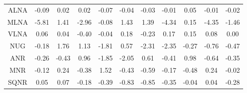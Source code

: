 \documentclass[11pt,a4paper]{report}
\begin{document}
\begin{longtable}{ | c || c | c | c | c | c | c | c | c | c || c |}
ALNA &  \cellcolor[HTML]{FFFFFF} -0.09 &  \cellcolor[HTML]{FFFFFF} 0.02 &  \cellcolor[HTML]{FFFFFF} 0.02 &  \cellcolor[HTML]{FFFFFF} -0.07 &  \cellcolor[HTML]{FFFFFF} -0.04 &  \cellcolor[HTML]{FFFFFF} -0.03 &  \cellcolor[HTML]{FFFFFF} -0.01 &  \cellcolor[HTML]{FFFFFF} 0.05 &  \cellcolor[HTML]{FFFFFF} -0.01 &  \cellcolor[HTML]{FFFFFF} -0.02 \\
MLNA &  \cellcolor[HTML]{FF7070} -5.81 &  \cellcolor[HTML]{DFDFFF} 1.41 &  \cellcolor[HTML]{FFB7B7} -2.96 &  \cellcolor[HTML]{FFFFFF} -0.08 &  \cellcolor[HTML]{DFDFFF} 1.43 &  \cellcolor[HTML]{DFDFFF} 1.39 &  \cellcolor[HTML]{FF8F8F} -4.34 &  \cellcolor[HTML]{FFFFFF} 0.15 &  \cellcolor[HTML]{FF8F8F} -4.35 &  \cellcolor[HTML]{FFD7D7} -1.46 \\
VLNA &  \cellcolor[HTML]{FFFFFF} 0.06 &  \cellcolor[HTML]{FFFFFF} 0.04 &  \cellcolor[HTML]{FFF7F7} -0.40 &  \cellcolor[HTML]{FFFFFF} -0.04 &  \cellcolor[HTML]{F7F7FF} 0.18 &  \cellcolor[HTML]{FFF7F7} -0.23 &  \cellcolor[HTML]{F7F7FF} 0.17 &  \cellcolor[HTML]{FFFFFF} 0.15 &  \cellcolor[HTML]{FFFFFF} 0.08 &  \cellcolor[HTML]{FFFFFF} 0.00 \\
NUG &  \cellcolor[HTML]{FFF7F7} -0.18 &  \cellcolor[HTML]{CFCFFF} 1.76 &  \cellcolor[HTML]{DFDFFF} 1.13 &  \cellcolor[HTML]{FFCFCF} -1.81 &  \cellcolor[HTML]{EFEFFF} 0.57 &  \cellcolor[HTML]{FFC7C7} -2.31 &  \cellcolor[HTML]{FFC7C7} -2.35 &  \cellcolor[HTML]{FFF7F7} -0.27 &  \cellcolor[HTML]{FFEFEF} -0.76 &  \cellcolor[HTML]{FFF7F7} -0.47 \\
ANR &  \cellcolor[HTML]{FFF7F7} -0.26 &  \cellcolor[HTML]{FFF7F7} -0.43 &  \cellcolor[HTML]{E7E7FF} 0.96 &  \cellcolor[HTML]{FFCFCF} -1.85 &  \cellcolor[HTML]{FFCFCF} -2.05 &  \cellcolor[HTML]{EFEFFF} 0.61 &  \cellcolor[HTML]{FFF7F7} -0.41 &  \cellcolor[HTML]{E7E7FF} 0.98 &  \cellcolor[HTML]{FFEFEF} -0.64 &  \cellcolor[HTML]{FFF7F7} -0.35 \\
MNR &  \cellcolor[HTML]{FFFFFF} -0.12 &  \cellcolor[HTML]{F7F7FF} 0.24 &  \cellcolor[HTML]{FFF7F7} -0.38 &  \cellcolor[HTML]{D7D7FF} 1.52 &  \cellcolor[HTML]{FFF7F7} -0.43 &  \cellcolor[HTML]{FFEFEF} -0.59 &  \cellcolor[HTML]{FFF7F7} -0.17 &  \cellcolor[HTML]{FFEFEF} -0.48 &  \cellcolor[HTML]{F7F7FF} 0.24 &  \cellcolor[HTML]{FFFFFF} -0.02 \\
SQNR &  \cellcolor[HTML]{FFFFFF} 0.05 &  \cellcolor[HTML]{FFFFFF} 0.07 &  \cellcolor[HTML]{FFF7F7} -0.18 &  \cellcolor[HTML]{FFF7F7} -0.39 &  \cellcolor[HTML]{FFE7E7} -0.83 &  \cellcolor[HTML]{FFE7E7} -0.85 &  \cellcolor[HTML]{FFF7F7} -0.35 &  \cellcolor[HTML]{FFFFFF} -0.04 &  \cellcolor[HTML]{FFFFFF} 0.04 &  \cellcolor[HTML]{FFF7F7} -0.28 \\

\end{longtable}
\end{document}
